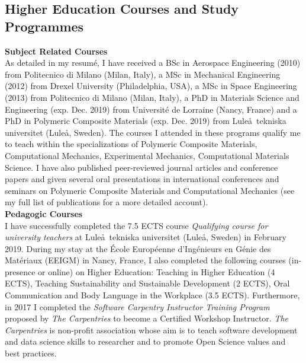 \documentclass[
  a4paper, 
]{fortysecondscv}
\begin{document}
\subsection{Higher Education Courses and Study Programmes}
\textbf{Subject Related Courses}\\
As detailed in my resum\'e, I have received a BSc in Aerospace Engineering (2010) from Politecnico di Milano (Milan, Italy), a MSc in Mechanical Engineering (2012) from Drexel University (Philadelphia, USA), a MSc in Space Engineering (2013) from Politecnico di Milano (Milan, Italy), a PhD in Materials Science and Engineering (exp. Dec. 2019) from Universit\'e de Lorraine (Nancy, France) and a PhD in Polymeric Composite Materials (exp. Dec. 2019) from Lule\aa\ tekniska universitet (Lule\aa, Sweden). The courses I attended in these programs qualify me to teach within the specializations of Polymeric Composite Materials, Computational Mechanics, Experimental Mechanics, Computational Materials Science. I have also published peer-reviewed journal articles and conference papers and given several oral presentations in international conferences and seminars on Polymeric Composite Materials and Computational Mechanics (see my full list of publications for a more detailed account).\\[2pt]
\textbf{Pedagogic Courses}\\
I have successfully completed the 7.5 ECTS course \emph{Qualifying course for university teachers} at Lule\aa\ tekniska universitet (Lule\aa, Sweden) in February 2019. During my stay at the \'Ecole Europ\'eenne d'Ing\'enieurs en G\'enie des Mat\'eriaux (EEIGM) in Nancy, France, I also completed the following courses (in-presence or online) on Higher Education: Teaching in Higher Education (4 ECTS), Teaching Sustainability and Sustainable Development (2 ECTS), Oral Communication and Body Language in the Workplace (3.5 ECTS). Furthermore, in 2017 I completed the \textit{Software Carpentry Instructor Training Program} proposed by \textit{The Carpentries} to become a Certified Workshop Instructor. \textit{The Carpentries} is non-profit association whose aim is to teach software development and data science skills to researcher and to promote Open Science values and best practices.
\end{document}
